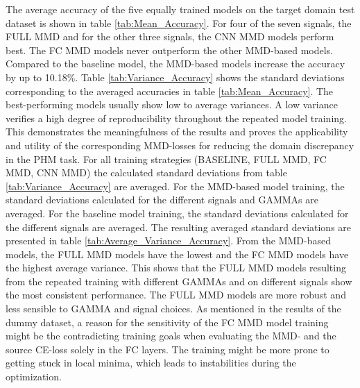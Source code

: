 The average accuracy of the five equally trained models on the target domain test dataset is shown in table \ref{tab:Mean_Accuracy}. For four of the seven signals, the FULL MMD and for the other three signals, the CNN MMD models perform best. The FC MMD models never outperform the other MMD-based models. Compared to the baseline model, the MMD-based models increase the accuracy by up to 10.18$\%$. Table \ref{tab:Variance_Accuracy} shows the standard deviations corresponding to the averaged accuracies in table \ref{tab:Mean_Accuracy}. The best-performing models usually show low to average variances. A low variance verifies a high degree of reproducibility throughout the repeated model training. This demonstrates the meaningfulness of the results and proves the applicability and utility of the corresponding MMD-losses for reducing the domain discrepancy in the PHM task. For all training strategies (BASELINE, FULL MMD, FC MMD, CNN MMD) the calculated standard deviations from table \ref{tab:Variance_Accuracy} are averaged. For the MMD-based model training, the standard deviations calculated for the different signals and GAMMAs are averaged. For the baseline model training, the standard deviations calculated for the different signals are averaged. The resulting averaged standard deviations are presented in table \ref{tab:Average_Variance_Accuracy}. From the MMD-based models, the FULL MMD models have the lowest and the FC MMD models have the highest average variance. This shows that the FULL MMD models resulting from the repeated training with different GAMMAs and on different signals show the most consistent performance. The FULL MMD models are more robust and less sensible to GAMMA and signal choices. As mentioned in the results of the dummy dataset, a reason for the sensitivity of the FC MMD model training might be the contradicting training goals when evaluating the MMD- and the source CE-loss solely in the FC layers. The training might be more prone to getting stuck in local minima, which leads to instabilities during the optimization.

